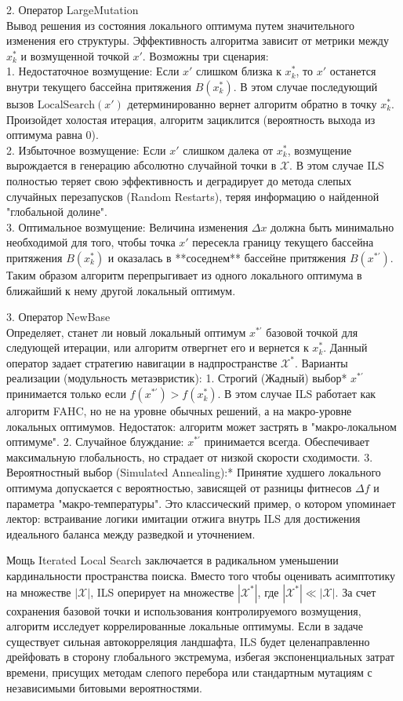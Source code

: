 2. Оператор LargeMutation \\
Вывод решения из состояния локального оптимума путем значительного изменения его структуры. Эффективность алгоритма зависит от метрики между $x^*_k$ и возмущенной точкой $x'$. Возможны три сценария: \\
1.  Недостаточное возмущение: Если $x'$ слишком близка к $x^*_k$, то $x'$ останется внутри текущего бассейна притяжения $B(x^*_k)$. В этом случае последующий вызов $\text{LocalSearch}(x')$ детерминированно вернет алгоритм обратно в точку $x^*_k$. Произойдет холостая итерация, алгоритм зациклится (вероятность выхода из оптимума равна 0). \\
2.  Избыточное возмущение: Если $x'$ слишком далека от $x^*_k$, возмущение вырождается в генерацию абсолютно случайной точки в $\mathcal{X}$. В этом случае ILS полностью теряет свою эффективность и деградирует до метода слепых случайных перезапусков (Random Restarts), теряя информацию о найденной "глобальной долине". \\
3.  Оптимальное возмущение: Величина изменения $\Delta x$ должна быть минимально необходимой для того, чтобы точка $x'$ пересекла границу текущего бассейна притяжения $B(x^*_k)$ и оказалась в **соседнем** бассейне притяжения $B(x^{*\prime})$. Таким образом алгоритм перепрыгивает из одного локального оптимума в ближайший к нему другой локальный оптимум.

3. Оператор NewBase \\
Определяет, станет ли новый локальный оптимум $x^{*\prime}$ базовой точкой для следующей итерации, или алгоритм отвергнет его и вернется к $x^*_k$. Данный оператор задает стратегию навигации в надпространстве $\mathcal{X}^*$.
Варианты реализации (модульность метаэвристик):
    1.  Строгий (Жадный) выбор* $x^{*\prime}$ принимается только если $f(x^{*\prime}) > f(x^*_k)$. В этом случае ILS работает как алгоритм FAHC, но не на уровне обычных решений, а на макро-уровне локальных оптимумов. Недостаток: алгоритм может застрять в "макро-локальном оптимуме".
    2.  Случайное блуждание: $x^{*\prime}$ принимается всегда. Обеспечивает максимальную глобальность, но страдает от низкой скорости сходимости.
    3.  Вероятностный выбор (Simulated Annealing):* Принятие худшего локального оптимума допускается с вероятностью, зависящей от разницы фитнесов $\Delta f$ и параметра "макро-температуры". Это классический пример, о котором упоминает лектор: встраивание логики имитации отжига внутрь ILS для достижения идеального баланса между разведкой и уточнением.

Мощь Iterated Local Search заключается в радикальном уменьшении кардинальности пространства поиска. Вместо того чтобы оценивать асимптотику на множестве $|\mathcal{X}|$, ILS оперирует на множестве $|\mathcal{X}^*|$, где $|\mathcal{X}^*| \ll |\mathcal{X}|$. За счет сохранения базовой точки и использования контролируемого возмущения, алгоритм исследует коррелированные локальные оптимумы. Если в задаче существует сильная автокорреляция ландшафта, ILS будет целенаправленно дрейфовать в сторону глобального экстремума, избегая экспоненциальных затрат времени, присущих методам слепого перебора или стандартным мутациям с независимыми битовыми вероятностями.


